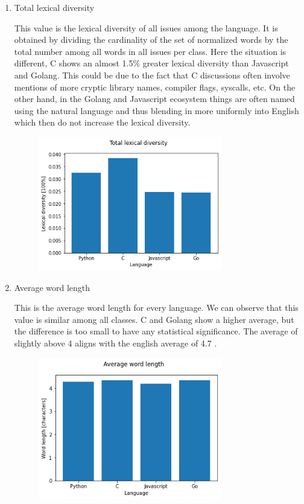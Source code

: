 \documentclass[]{article}
\begin{document}
\begin{enumerate}
    \item Total lexical diversity

          This value is the lexical diversity of all issues among the language. It is obtained by dividing the cardinality of the set of normalized words by the total number among all words in all issues per class. Here the situation is different, C shows an almost 1.5\% greater lexical diversity than Javascript and Golang. This could be due to the fact that C discussions often involve mentions of more cryptic library names, compiler flags, syscalls, etc. On the other hand, in the Golang and Javascript ecosystem things are often named using the natural language and thus blending in more uniformly into English which then do not increase the lexical diversity.

          \begin{figure}[H]
              \includegraphics[width=8cm]{lex_div_total.png}
              \centering
          \end{figure}

    \item Average word length

          This is the average word length for every language. We can observe that this value is similar among all classes. C and Golang show a higher average, but the difference is too small to have any statistical significance. The average of slightly above 4 aligns with the english average of 4.7 \cite{letterfreq}.

          \begin{figure}[H]
              \includegraphics[width=8cm]{word_len.png}
              \centering
          \end{figure}


\end{enumerate}
\end{document}
